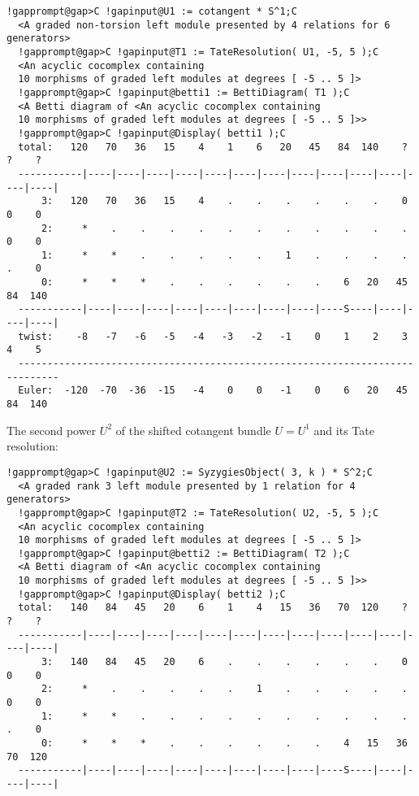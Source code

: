 \documentclass[a4paper,11pt]{report}
\begin{document}
{{{\begin{Verbatim}[commandchars=!@C,fontsize=\small,frame=single,label=Example]
  !gapprompt@gap>C !gapinput@U1 := cotangent * S^1;C
  <A graded non-torsion left module presented by 4 relations for 6 generators>
  !gapprompt@gap>C !gapinput@T1 := TateResolution( U1, -5, 5 );C
  <An acyclic cocomplex containing
  10 morphisms of graded left modules at degrees [ -5 .. 5 ]>
  !gapprompt@gap>C !gapinput@betti1 := BettiDiagram( T1 );C
  <A Betti diagram of <An acyclic cocomplex containing 
  10 morphisms of graded left modules at degrees [ -5 .. 5 ]>>
  !gapprompt@gap>C !gapinput@Display( betti1 );C
  total:   120   70   36   15    4    1    6   20   45   84  140    ?    ?    ?
  -----------|----|----|----|----|----|----|----|----|----|----|----|----|----|
      3:   120   70   36   15    4    .    .    .    .    .    .    0    0    0
      2:     *    .    .    .    .    .    .    .    .    .    .    .    0    0
      1:     *    *    .    .    .    .    .    1    .    .    .    .    .    0
      0:     *    *    *    .    .    .    .    .    .    6   20   45   84  140
  -----------|----|----|----|----|----|----|----|----|----S----|----|----|----|
  twist:    -8   -7   -6   -5   -4   -3   -2   -1    0    1    2    3    4    5
  -----------------------------------------------------------------------------
  Euler:  -120  -70  -36  -15   -4    0    0   -1    0    6   20   45   84  140
\end{Verbatim}
 The second power $U^2$ of the shifted cotangent bundle $U=U^1$ and its Tate resolution: 
\begin{Verbatim}[commandchars=!@C,fontsize=\small,frame=single,label=Example]
  !gapprompt@gap>C !gapinput@U2 := SyzygiesObject( 3, k ) * S^2;C
  <A graded rank 3 left module presented by 1 relation for 4 generators>
  !gapprompt@gap>C !gapinput@T2 := TateResolution( U2, -5, 5 );C
  <An acyclic cocomplex containing
  10 morphisms of graded left modules at degrees [ -5 .. 5 ]>
  !gapprompt@gap>C !gapinput@betti2 := BettiDiagram( T2 );C
  <A Betti diagram of <An acyclic cocomplex containing 
  10 morphisms of graded left modules at degrees [ -5 .. 5 ]>>
  !gapprompt@gap>C !gapinput@Display( betti2 );C
  total:   140   84   45   20    6    1    4   15   36   70  120    ?    ?    ?
  -----------|----|----|----|----|----|----|----|----|----|----|----|----|----|
      3:   140   84   45   20    6    .    .    .    .    .    .    0    0    0
      2:     *    .    .    .    .    .    1    .    .    .    .    .    0    0
      1:     *    *    .    .    .    .    .    .    .    .    .    .    .    0
      0:     *    *    *    .    .    .    .    .    .    4   15   36   70  120
  -----------|----|----|----|----|----|----|----|----|----S----|----|----|----|

\end{Verbatim}}}}
\end{document}
